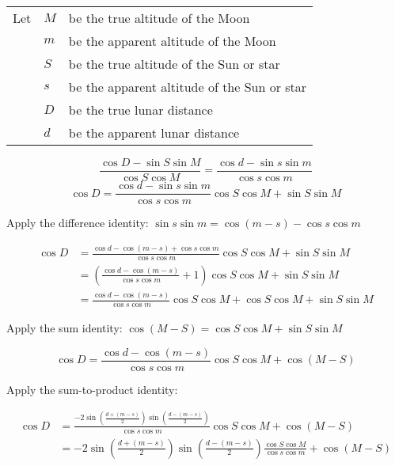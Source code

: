 \documentclass[letterpaper]{article}
\numberwithin{equation}{section}
\begin{document}
	\setlength\tabcolsep{2pt}
	\begin{tabularx}{\textwidth}{@{}llX@{}}
	Let
	  & $M$ & be the true altitude of the Moon \\
	  & $m$ & be the apparent altitude of the Moon \\
	  & $S$ & be the true altitude of the Sun or star \\
	  & $s$ & be the apparent altitude of the Sun or star \\
	  & $D$ & be the true lunar distance \\
	  & $d$ & be the apparent lunar distance \\
	\end{tabularx}
	
	\begin{equation}
	\frac{\cos D - \sin S \sin M}{\cos S \cos M} = \frac{\cos d - \sin s \sin m}{\cos s \cos m}
	\end{equation}
	\begin{equation}
	\cos D = \frac{\cos d - \sin s \sin m}{\cos s \cos m}\cos S \cos M + \sin S \sin M
	\end{equation}

	Apply the difference identity: $\sin s \sin m = \cos(m-s) - \cos s \cos m$
	
	\begin{equation}
	\begin{split}
	\cos D & = \frac{\cos d - \cos(m-s) + \cos s \cos m}{\cos s \cos m}\cos S \cos M + \sin S \sin M \\
	& = \left(\frac{\cos d - \cos(m-s)}{\cos s \cos m} + 1\right) \cos S \cos M + \sin S \sin M \\
	& = \frac{\cos d - \cos(m-s)}{\cos s \cos m} \cos S \cos M + \cos S \cos M + \sin S \sin M
	\end{split}
	\end{equation}

	Apply the sum identity: $\cos (M-S) = \cos S \cos M + \sin S \sin M$

	\begin{equation}
	\cos D = \frac{\cos d - \cos(m-s)}{\cos s \cos m} \cos S \cos M + \cos (M-S)
	\end{equation}

	Apply the sum-to-product identity:

	\begin{equation}
	\begin{split}
	\cos D & = \frac{-2 \sin \left( \frac{d + (m-s)}{2} \right) \sin \left( \frac{d - (m-s)}{2} \right) }{\cos s \cos m} \cos S \cos M + \cos (M-S) \\
	& = -2 \sin \left( \tfrac{d + (m-s)}{2} \right) \sin \left( \tfrac{d - (m-s)}{2} \right) \frac{\cos S \cos M}{\cos s \cos m}  + \cos (M-S)
	\end{split}
	\end{equation}
\end{document}
